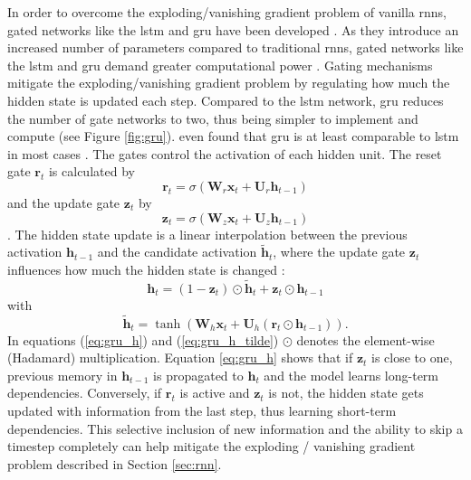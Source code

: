 \documentclass[12pt, a4paper, headinclude, twoside, plainheadsepline, open=right, numbers=noenddot, hidelinks, toc=listof, toc=bibliography]{scrreprt}
\begin{document}
In order to overcome the exploding/vanishing gradient problem of vanilla \acp{rnn}, gated networks like the \ac{lstm} \cite{hochreiterLongShortTermMemory1997} and \ac{gru} \cite{choLearningPhraseRepresentations2014} have been developed \cite{vanhoudtReviewLongShortterm2020}.
As they introduce an increased number of parameters compared to traditional \acp{rnn}, gated networks like the \ac{lstm} and \ac{gru} demand greater computational power \cite{deyGatevariantsGatedRecurrent2017}.
Gating mechanisms mitigate the exploding/vanishing gradient problem by regulating how much the hidden state is updated each step.
Compared to the \ac{lstm} network, \ac{gru} reduces the number of gate networks to two, thus being simpler to implement and compute \cite{choLearningPhraseRepresentations2014} (see Figure \ref{fig:gru}).
 even found that \ac{gru} is at least comparable to \ac{lstm} in most cases \cite{chungEmpiricalEvaluationGated2014}.
The gates control the activation of each hidden unit.
The reset gate $\mathbf{r}_t$ is calculated by
\begin{equation}
\label{eq:gru_reset}
\mathbf{r}_t = \sigma (\mathbf{W}_r \mathbf{x}_t + \mathbf{U}_r \mathbf{h}_{t-1})
\end{equation}
and the update gate $\mathbf{z}_t$ by
\begin{equation}
\label{eq:gru_update}
\mathbf{z}_t = \sigma (\mathbf{W}_z \mathbf{x}_t + \mathbf{U}_z \mathbf{h}_{t-1})
\end{equation}
\cite{deyGatevariantsGatedRecurrent2017}.
The hidden state update is a linear interpolation between the previous activation $\mathbf{h}_{t-1}$ and the candidate activation $\mathbf{\tilde{h}}_t$, where the update gate $\mathbf{z}_t$ influences how much the hidden state is changed \cite{chungEmpiricalEvaluationGated2014}:
\begin{equation}
\label{eq:gru_h}
\mathbf{h}_t = (1-\mathbf{z}_t) \odot \mathbf{\tilde{h}}_t + \mathbf{z}_t \odot \mathbf{h}_{t-1} 
\end{equation}
with
\begin{equation}
\label{eq:gru_h_tilde}
\mathbf{\tilde{h}}_t = \tanh(\mathbf{W}_h \mathbf{x}_t + \mathbf{U}_h (\mathbf{r}_t \odot \mathbf{h}_{t-1})).
\end{equation}
In equations (\ref{eq:gru_h}) and (\ref{eq:gru_h_tilde}) $\odot$ denotes the element-wise (Hadamard) multiplication.
Equation \ref{eq:gru_h} shows that if $\mathbf{z}_t$ is close to one, previous memory in $\mathbf{h}_{t-1}$ is propagated to $\mathbf{h}_t$ and the model learns long-term dependencies.
Conversely, if $\mathbf{r}_t$ is active and $\mathbf{z}_t$ is not, the hidden state gets updated with information from the last step, thus learning short-term dependencies.
This selective inclusion of new information and the ability to skip a timestep completely can help mitigate the exploding / vanishing gradient problem described in Section \ref{sec:rnn}.
\end{document}
